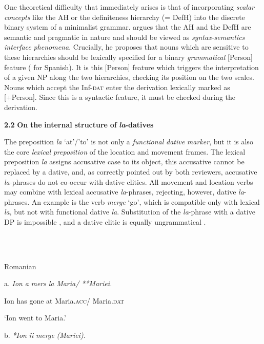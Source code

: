 \documentclass[output=paper,colorlinks,citecolor=brown]{./langscibook}
\begin{document}
One theoretical difficulty that immediately arises is that of incorporating \textit{scalar} \textit{concepts} like the AH or the definiteness hierarchy (= DefH) into the discrete binary system of a minimalist grammar. \citet{Richards2008} argues that the AH and the DefH are semantic and pragmatic in nature and should be viewed as \textit{syntax-semantics} \textit{interface} \textit{phenomena}. Crucially, he proposes that nouns which are sensitive to these hierarchies should be lexically specified for a binary \textit{grammatical} [Person] feature (\citealt{Rodríguez-Mondoñedo2007} for Spanish). It is this [Person] feature which triggers the interpretation of a given NP along the two hierarchies, checking its position on the two scales. Nouns which accept the Inf-\textsc{dat} enter the derivation lexically marked as [+Person]. Since this is a syntactic feature, it must be checked during the derivation. 

\textbf{2.2} \textbf{On} \textbf{the} \textbf{internal} \textbf{structure} \textbf{of} \textbf{\textit{la}}\textbf{{}-datives}

The preposition \textit{la} ‘at’/’to’ is not only a \textit{functional} \textit{dative} \textit{marker}, but it is also the core \textit{lexical} \textit{preposition} of the location and movement frames. The lexical preposition \textit{la} assigns accusative case to its object, this accusative cannot be replaced by a dative, and, as correctly pointed out by both reviewers, accusative \textit{la-}phrases do not co-occur with dative clitics. All movement and location verbs may combine with lexical accusative \textit{la}{}-phrases, rejecting, however, dative \textit{la}{}-phrases. An example is the verb \textit{merge} ‘go’, which is compatible only with lexical \textit{la}, but not with functional dative \textit{la}. Substitution of the \textit{la}{}-phrase with a dative DP is impossible , and a dative clitic is equally ungrammatical .

\ea%
    \label{ex:key:9}
    \gll\\
        \\
    \glt
    \z

          Romanian

 a.  \textit{Ion}   \textit{a} \textit{mers}    \textit{la} \textit{Maria/}  \textit{**Mariei.}

    Ion   has gone   at Maria.\textsc{acc}/   Maria.\textsc{dat}

    ‘Ion went to Maria.’

b.  \textit{*Ion}  \textit{îi} \textit{merge}   \textit{(Mariei).}
\end{document}
